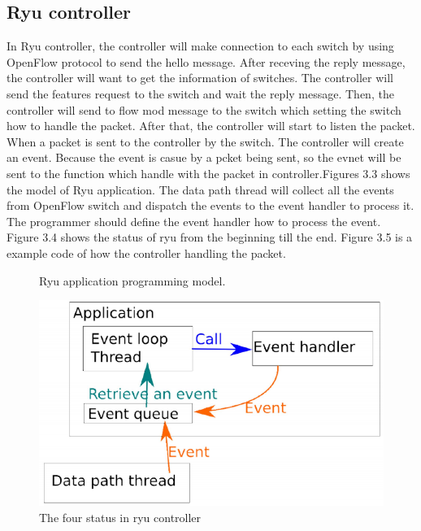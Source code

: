 \documentclass[a4paper,12pt]{report}
\begin{document}
\begin{large}
    \section{Ryu controller}
    \qquad In Ryu controller, the controller will make connection to each switch by using OpenFlow protocol to send the hello message. After receving the reply message, the controller will want to get the information of switches. The controller will send the features request to the switch and wait the reply message. Then, the controller will send to flow mod message to the switch which setting the switch how to handle the packet. After that, the controller will start to listen the packet. When a packet is sent to the controller by the switch. The controller will create an event. Because the event is casue by a pcket being sent, so the evnet will be sent to the function which handle with the packet in controller.Figures 3.3 shows the model of Ryu application. The data path thread will collect all the events from OpenFlow switch and dispatch the events to the event handler to process it. The programmer should define the event handler how to process the event. Figure 3.4 shows the status of ryu from the beginning till the end. Figure 3.5 is a example code of how the controller handling the packet.
     \begin{figure}[p]
          \caption{Ryu application programming model.}
          \centering
            \includegraphics[width=1.0\textwidth]{ryu_model.png}
          \caption{The four status in ryu controller}

\end{figure}
\end{large}
\end{document}
